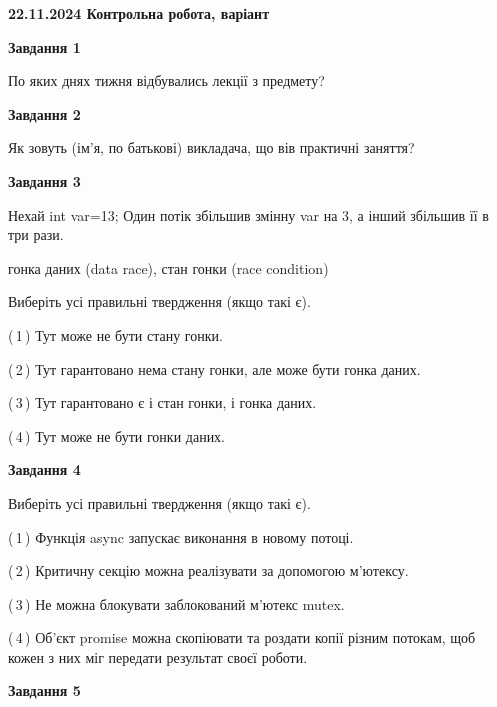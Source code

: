 \documentclass[12pt, ukrainian]{article}
\begin{document}
\begin {large}

\textbf{22.11.2024 Контрольна робота, варіант  }\par


{

\begin{center}
\textbf{Завдання 1}
\end{center}

По яких днях тижня відбувались лекції з предмету?


\begin{center}
\textbf{Завдання 2}
\end{center}

Як зовуть (ім'я, по батькові) викладача, що вів практичні заняття?


\begin{center}
\textbf{Завдання 3}
\end{center}

Нехай int var=13; Один потік збільшив змінну var на 3, а інший збільшив її в три рази.

гонка даних (data race), стан гонки (race condition)

Виберіть усі правильні твердження (якщо такі є).\par
\vspace{2mm}
(\,1\,) Тут може не бути стану гонки.%

(\,2\,) Тут гарантовано нема стану гонки, але може бути гонка даних.%

(\,3\,) Тут гарантовано є і стан гонки, і гонка даних.%

(\,4\,) Тут може не бути гонки даних.%


\begin{center}
\textbf{Завдання 4}
\end{center}

Виберіть усі правильні твердження (якщо такі є).\par
\vspace{2mm}

(\,1\,) Функція async запускає виконання в новому потоці.%

(\,2\,) Критичну секцію можна реалізувати за допомогою м’ютексу.%

(\,3\,) Не можна блокувати заблокований м’ютекс mutex.%

(\,4\,) Об’єкт promise можна скопіювати та роздати копії різним потокам, щоб кожен з них міг передати результат своєї роботи.%


\begin{center}
\textbf{Завдання 5}
\end{center}

}
\end{large}
\end{document}

